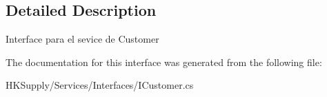 \subsection{Detailed Description}
Interface para el sevice de Customer 



The documentation for this interface was generated from the following file\+:\begin{DoxyCompactItemize}
\item 
H\+K\+Supply/\+Services/\+Interfaces/I\+Customer.\+cs\end{DoxyCompactItemize}
